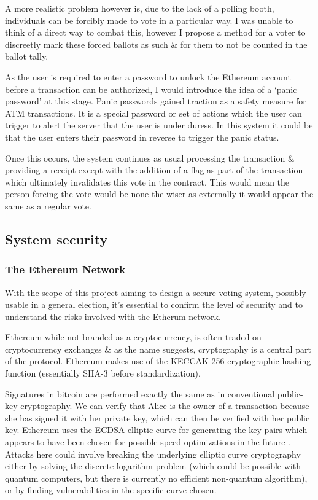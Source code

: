 \documentclass{article}
\begin{document}
	A more realistic problem however is, due to the lack of a polling booth, individuals can be forcibly made to vote in a particular way. I was unable to think of a direct way to combat this, however I propose a method for a voter to discreetly mark these forced ballots as such \& for them to not be counted in the ballot tally.
	
	As the user is required to enter a password to unlock the Ethereum account before a transaction can be authorized, I would introduce the idea of a `panic password' at this stage. Panic passwords gained traction as a safety measure for ATM transactions. It is a special password or set of actions which the user can trigger to alert the server that the user is under duress. In this system it could be that the user enters their password in reverse to trigger the panic status.
	
	Once this occurs, the system continues as usual processing the transaction \& providing a receipt except with the addition of a flag as part of the transaction which ultimately invalidates this vote in the contract. This would mean the person forcing the vote would be none the wiser as externally it would appear the same as a regular vote.	
	
	\cleardoublepage
	\subsection{System security}
	\subsubsection{The Ethereum Network}
	 With the scope of this project aiming to design a secure voting system, possibly usable in a general election, it's essential to confirm the level of security and to understand the risks involved with the Etherum network.

Ethereum while not branded as a cryptocurrency, is often traded on cryptocurrency exchanges \& as the name suggests, cryptography is a central part of the protocol. Ethereum makes use of the KECCAK-256 cryptographic hashing function (essentially SHA-3 before standardization).

Signatures in bitcoin are performed exactly the same as in conventional public-key cryptography. We can verify that Alice is the owner of a transaction because she has signed it with her private key, which can then be verified with her public key. Ethereum uses the ECDSA elliptic curve for generating the key pairs which appears to have been chosen for possible speed optimizations in the future \citep{41_yang_2011}. Attacks here could involve breaking the underlying elliptic curve cryptography either by solving the discrete logarithm problem (which could be possible with quantum computers, but there is currently no efficient non-quantum algorithm), or by finding vulnerabilities in the specific curve chosen.
\end{document}

